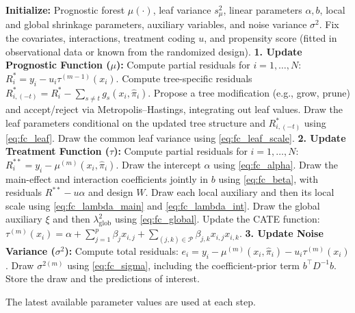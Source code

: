 \documentclass[12pt]{article}
\begin{document}
\begin{algorithm}[htbp]
\caption{Bayesian Backfitting MCMC Scheme for B-SLIM}
\label{algorithm backfitting}
\begin{algorithmic}[1]
\State \textbf{Initialize:} Prognostic forest $\mu(\cdot)$, leaf variance
$s_\mu^2$, linear parameters $\alpha,b$, local and global shrinkage
parameters, auxiliary variables, and noise variance $\sigma^2$.
\State Fix the covariates, interactions, treatment coding $u$, and propensity
score (fitted in observational data or known from the randomized design).
    \State \textbf{1. Update Prognostic Function ($\mu$):}
    \State Compute partial residuals for $i=1,\ldots,N$:
    \State \quad $R_i^*=y_i-u_i\tau^{(m-1)}(x_i)$.
        \State Compute tree-specific residuals
        $R^*_{i,(-t)}=R_i^*-\sum_{s\ne t}g_s(x_i,\hat\pi_i)$.
        \State Propose a tree modification (e.g., grow, prune) and
        accept/reject via Metropolis--Hastings, integrating out leaf values.
        \State Draw the leaf parameters conditional on the updated tree
        structure and $R^*_{i,(-t)}$ using \eqref{eq:fc_leaf}.
    \EndFor
    \State Draw the common leaf variance using \eqref{eq:fc_leaf_scale}.
    \State \textbf{2. Update Treatment Function ($\tau$):}
    \State Compute partial residuals for $i=1,\ldots,N$:
    \State \quad $R_i^{**}=y_i-\mu^{(m)}(x_i,\hat\pi_i)$.
    \State Draw the intercept $\alpha$ using \eqref{eq:fc_alpha}.
    \State Draw the main-effect and interaction coefficients jointly in $b$
    using \eqref{eq:fc_beta}, with residuals $R^{**}-u\alpha$ and design $W$.
    \State Draw each local auxiliary and then its local scale using
    \eqref{eq:fc_lambda_main} and \eqref{eq:fc_lambda_int}.
    \State Draw the global auxiliary $\xi$ and then
    $\lambda_{\mathrm{glob}}^2$ using \eqref{eq:fc_global}.
    \State Update the CATE function:
    \State \quad $\tau^{(m)}(x_i)=\alpha+\sum_{j=1}^{p}\beta_j x_{i,j}+\sum_{(j,k)\in\mathcal P}\beta_{j,k}x_{i,j}x_{i,k}$.
    \State \textbf{3. Update Noise Variance ($\sigma^2$):}
    \State Compute total residuals:
    \State \quad $e_i=y_i-\mu^{(m)}(x_i,\hat\pi_i)-u_i\tau^{(m)}(x_i)$.
    \State Draw $\sigma^{2(m)}$ using \eqref{eq:fc_sigma}, including the
    coefficient-prior term $b^\top D^{-1}b$.
        \State Store the draw and the predictions of interest.
    \EndIf
\EndFor
\end{algorithmic}
\end{algorithm}

The latest available parameter values are used at each step.

\FloatBarrier


\end{document}
